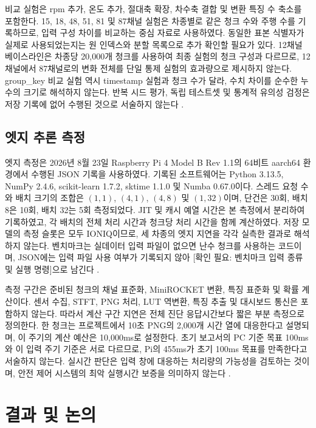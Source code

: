 \documentclass[11pt,a4paper]{article}
\newcommand{\checkneeded}[1]{\textcolor{red!65!black}{[확인 필요: #1]}}
\newcommand{\sourceproject}{\citep{project2026}}
\begin{document}
비교 실험은 rpm 추가, 온도 추가, 절대축 확장, 차수축 결합 및 변환 특징 수 축소를 포함한다.
15, 18, 48, 51, 81 및 87채널 실험은 차종별로 같은 청크 수와 주행 수를 기록하므로, 입력 구성 차이를 비교하는 중심 자료로 사용하였다.
동일한 표본 식별자가 실제로 사용되었는지는 원 인덱스와 분할 목록으로 추가 확인할 필요가 있다.
12채널 베이스라인은 차종당 20,000개 청크를 사용하여 최종 실험의 청크 구성과 다르므로, 12채널에서 87채널로의 변화 전체를 단일 통제 실험의 효과량으로 제시하지 않는다.
group\_key 비교 실험 역시 timestamp 실험과 청크 수가 달라, 수치 차이를 순수한 누수의 크기로 해석하지 않는다.
반복 시드 평가, 독립 테스트셋 및 통계적 유의성 검정은 저장 기록에 없어 수행된 것으로 서술하지 않는다 \sourceproject.

\subsection{엣지 추론 측정}
엣지 측정은 2026년 8월 23일 Raspberry Pi 4 Model B Rev 1.1의 64비트 aarch64 환경에서 수행된 JSON 기록을 사용하였다.
기록된 소프트웨어는 Python 3.13.5, NumPy 2.4.6, scikit-learn 1.7.2, sktime 1.1.0 및 Numba 0.67.0이다.
스레드 요청 수와 배치 크기의 조합은 $(1,1)$, $(4,1)$, $(4,8)$ 및 $(1,32)$이며, 단건은 30회, 배치 8은 10회, 배치 32는 5회 측정되었다.
JIT 및 캐시 예열 시간은 본 측정에서 분리하여 기록하였고, 각 배치의 전체 처리 시간과 청크당 처리 시간을 함께 계산하였다.
저장 모델의 측정 슬롯은 모두 IONIQ이므로, 세 차종의 엣지 지연을 각각 실측한 결과로 해석하지 않는다.
벤치마크는 실데이터 입력 파일이 없으면 난수 청크를 사용하는 코드이며, JSON에는 입력 파일 사용 여부가 기록되지 않아 \checkneeded{벤치마크 입력 종류 및 실행 명령}으로 남긴다 \sourceproject.

측정 구간은 준비된 청크의 채널 표준화, MiniROCKET 변환, 특징 표준화 및 확률 계산이다.
센서 수집, STFT, PNG 처리, LUT 역변환, 특징 추출 및 대시보드 통신은 포함하지 않는다.
따라서 계산 구간 지연은 전체 진단 응답시간보다 짧은 부분 측정으로 정의한다.
한 청크는 프로젝트에서 10초 PNG의 2,000개 시간 열에 대응한다고 설명되며, 이 주기의 계산 예산은 10,000ms로 설정한다.
초기 보고서의 PC 기준 목표 100ms와 이 입력 주기 기준은 서로 다르므로, Pi의 455ms가 초기 100ms 목표를 만족한다고 서술하지 않는다.
실시간 판단은 입력 창에 대응하는 처리량의 가능성을 검토하는 것이며, 안전 제어 시스템의 최악 실행시간 보증을 의미하지 않는다 \sourceproject.

\section{결과 및 논의}
\end{document}
